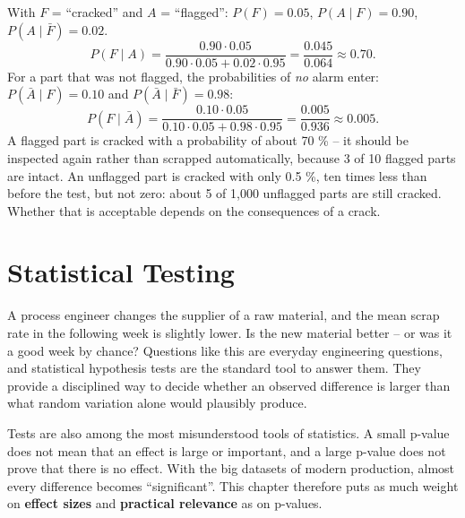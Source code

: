 \documentclass[
  letterpaper,
  DIV=11,
  numbers=noendperiod]{scrreprt}
\begin{document}
\begin{tcolorbox}[enhanced jigsaw, left=2mm, title=\textcolor{quarto-callout-caution-color}{\faFire}\hspace{0.5em}{Solution to Exercise 5}, opacityback=0, breakable, rightrule=.15mm, arc=.35mm, toptitle=1mm, colbacktitle=quarto-callout-caution-color!10!white, opacitybacktitle=0.6, coltitle=black, colframe=quarto-callout-caution-color-frame, bottomrule=.15mm, leftrule=.75mm, bottomtitle=1mm, titlerule=0mm, toprule=.15mm, colback=white]

With \(F\) = ``cracked'' and \(A\) = ``flagged'': \(P(F) = 0.05\),
\(P(A \mid F) = 0.90\), \(P(A \mid \bar F) = 0.02\).
\[P(F \mid A) = \frac{0.90 \cdot 0.05}{0.90 \cdot 0.05 + 0.02 \cdot 0.95} = \frac{0.045}{0.064} \approx 0.70.\]
For a part that was not flagged, the probabilities of \emph{no} alarm
enter: \(P(\bar A \mid F) = 0.10\) and \(P(\bar A \mid \bar F) = 0.98\):
\[P(F \mid \bar A) = \frac{0.10 \cdot 0.05}{0.10 \cdot 0.05 + 0.98 \cdot 0.95} = \frac{0.005}{0.936} \approx 0.005.\]
A flagged part is cracked with a probability of about 70 \% -- it should
be inspected again rather than scrapped automatically, because 3 of 10
flagged parts are intact. An unflagged part is cracked with only 0.5 \%,
ten times less than before the test, but not zero: about 5 of 1,000
unflagged parts are still cracked. Whether that is acceptable depends on
the consequences of a crack.

\end{tcolorbox}

\chapter{Statistical Testing}\label{statistical-testing}

A process engineer changes the supplier of a raw material, and the mean
scrap rate in the following week is slightly lower. Is the new material
better -- or was it a good week by chance? Questions like this are
everyday engineering questions, and statistical hypothesis tests are the
standard tool to answer them. They provide a disciplined way to decide
whether an observed difference is larger than what random variation
alone would plausibly produce.

Tests are also among the most misunderstood tools of statistics. A small
p-value does not mean that an effect is large or important, and a large
p-value does not prove that there is no effect. With the big datasets of
modern production, almost every difference becomes ``significant''. This
chapter therefore puts as much weight on \textbf{effect sizes} and
\textbf{practical relevance} as on p-values.
\end{document}

